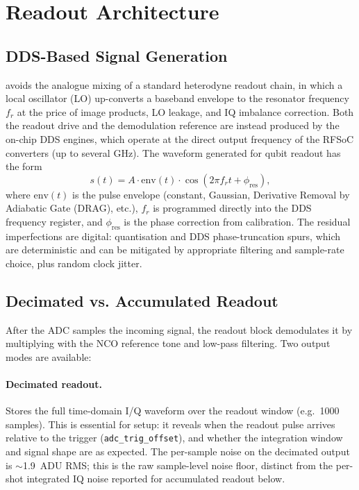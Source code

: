 \section{Readout Architecture}
\label{sec:readout}

\subsection{DDS-Based Signal Generation}

\QICK{} avoids the analogue mixing of a standard heterodyne readout chain, in
which a local oscillator (LO) up-converts a baseband envelope to the resonator
frequency $f_r$ at the price of image products, LO leakage, and IQ imbalance
correction.  Both the readout drive and the
demodulation reference are instead produced by the on-chip DDS engines, which operate at
the direct output frequency of the RFSoC converters (up to several GHz).  The
waveform generated for qubit readout has the form
\begin{equation}
  s(t) = A \cdot \text{env}(t) \cdot \cos(2\pi f_r t + \phi_\text{res}),
\end{equation}
where $\text{env}(t)$ is the pulse envelope (constant, Gaussian, Derivative
Removal by Adiabatic Gate (DRAG), etc.),
$f_r$ is programmed directly into the DDS frequency register, and
$\phi_\text{res}$ is the phase correction from calibration.  The residual
imperfections are digital: quantisation and DDS phase-truncation spurs, which are
deterministic and can be mitigated by appropriate filtering and sample-rate
choice, plus random clock jitter.

\subsection{Decimated vs. Accumulated Readout}
\label{subsec:decimated_vs_accum}

After the ADC samples the incoming signal, the \QICK{} readout block demodulates
it by multiplying with the NCO reference tone and low-pass filtering.  Two output
modes are available:

\paragraph{Decimated readout.}
Stores the full time-domain I/Q waveform over the readout window (e.g.\ 1000
samples).  This is essential for setup: it reveals when the readout pulse arrives
relative to the trigger (\texttt{adc\_trig\_offset}), and whether the integration
window and signal shape are as expected.  The
per-sample noise on the decimated output is $\sim$\SI{1.9}{ADU} RMS; this is the
raw sample-level noise floor, distinct from the per-shot integrated IQ noise
reported for accumulated readout below.

